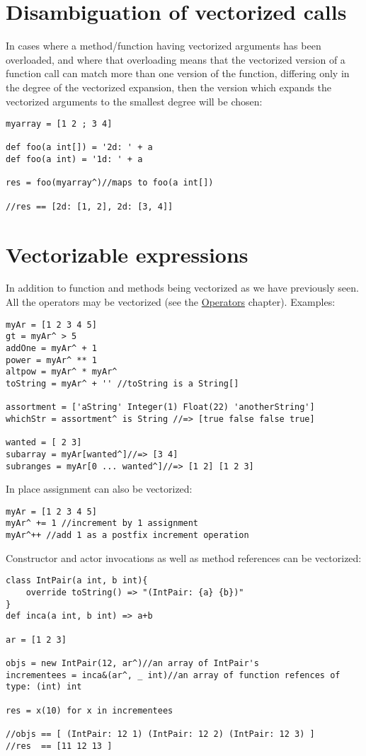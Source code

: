 \documentclass[conc-doc]{subfiles}
\begin{document}
\section{Disambiguation of vectorized calls}
In cases where a method/function having vectorized arguments has been overloaded, and where that overloading means that the vectorized version of a function call can match more than one version of the function, differing only in the degree of the vectorized expansion, then the version which expands the vectorized arguments to the smallest degree will be chosen:
\begin{lstlisting}
myarray = [1 2 ; 3 4]

def foo(a int[]) = '2d: ' + a
def foo(a int) = '1d: ' + a

res = foo(myarray^)//maps to foo(a int[])

//res == [2d: [1, 2], 2d: [3, 4]]
\end{lstlisting}

\section{Vectorizable expressions}
In addition to function and methods being vectorized as we have previously seen. All the operators may be vectorized (see the \hyperref[ch:Operators]{Operators} chapter). Examples:
\begin{lstlisting}
myAr = [1 2 3 4 5]
gt = myAr^ > 5
addOne = myAr^ + 1
power = myAr^ ** 1
altpow = myAr^ * myAr^
toString = myAr^ + '' //toString is a String[]

assortment = ['aString' Integer(1) Float(22) 'anotherString']
whichStr = assortment^ is String //=> [true false false true]

wanted = [ 2 3]
subarray = myAr[wanted^]//=> [3 4]
subranges = myAr[0 ... wanted^]//=> [1 2] [1 2 3]
\end{lstlisting}

In place assignment can also be vectorized:
\begin{lstlisting}
myAr = [1 2 3 4 5]
myAr^ += 1 //increment by 1 assignment
myAr^++ //add 1 as a postfix increment operation
\end{lstlisting}

Constructor and actor invocations as well as method references can be vectorized:
\begin{lstlisting}
class IntPair(a int, b int){
	override toString() => "(IntPair: {a} {b})"
}
def inca(a int, b int) => a+b

ar = [1 2 3]

objs = new IntPair(12, ar^)//an array of IntPair's
incrementees = inca&(ar^, _ int)//an array of function refences of type: (int) int

res = x(10) for x in incrementees

//objs == [ (IntPair: 12 1) (IntPair: 12 2) (IntPair: 12 3) ]
//res  == [11 12 13 ]
\end{lstlisting}
\end{document}
